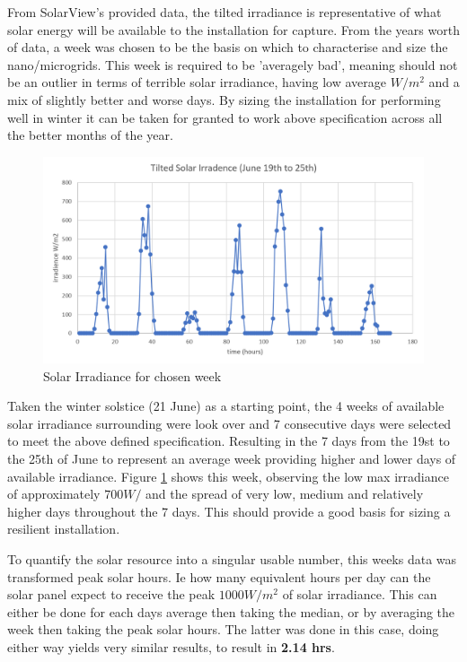 \documentclass[journal]{IEEEtran}
\begin{document}
        From SolarView's provided data, the tilted irradiance is representative of what solar energy will be available to the installation for capture. From the years worth of data, a week was chosen to be the basis on which to characterise and size the nano/microgrids. This week is required to be 'averagely bad', meaning should not be an outlier in terms of terrible solar irradiance, having low average $W/m^2$ and a mix of slightly better and worse days. By sizing the installation for performing well in winter it can be taken for granted to work above specification across all the better months of the year.

        \begin{figure}[h!]
                \centering
                \includegraphics[width=0.75\linewidth]{fig/solar_irad.png}
                \caption{Solar Irradiance for chosen week}
                \label{solarweek}
        \end{figure}

        Taken the winter solstice (21 June) as a starting point, the 4 weeks of available solar irradiance surrounding were look over and 7 consecutive days were selected to meet the above defined specification. Resulting in the 7 days from the 19st to the 25th of June to represent an average week providing higher and lower days of available irradiance. Figure \ref{solarweek} shows this week, observing the low max irradiance of approximately $700W/$ and the spread of very low, medium and relatively higher days throughout the 7 days. This should provide a good basis for sizing a resilient installation.


        To quantify the solar resource into a singular usable number, this weeks data was transformed peak solar hours. Ie how many equivalent hours per day can the solar panel expect to receive the peak $1000 W/m^2$ of solar irradiance. This can either be done for each days average then taking the median, or by averaging the week then taking the peak solar hours. The latter was done in this case, doing either way yields very similar results, to result in \textbf{2.14 hrs}.
\end{document}
